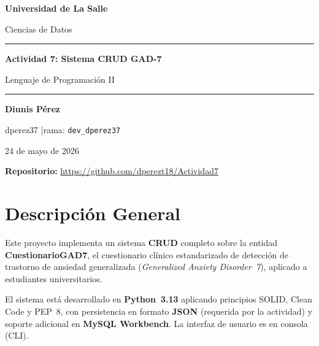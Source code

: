 \documentclass[12pt, a4paper]{article}
\begin{document}
\begin{titlepage}
  \centering
  \vspace*{3cm}
  {\Large\bfseries Universidad de La Salle\par}
  \vspace{0.3cm}
  {\normalsize Ciencias de Datos\par}
  \vspace{2.5cm}
  \rule{0.6\linewidth}{1pt}\par\vspace{1cm}
  {\LARGE\bfseries Actividad 7: Sistema CRUD GAD-7\par}
  \vspace{0.4cm}
  {\normalsize Lenguaje de Programación II\par}
  \vspace{1cm}
  \rule{0.6\linewidth}{1pt}\par\vspace{2.5cm}
  {\large\bfseries Diunis Pérez\par}
  \vspace{0.3cm}
  {\small dperez37 \quad|\quad rama: \texttt{dev\_dperez37}\par}
  \vspace{0.3cm}
  {\small 24 de mayo de 2026\par}
  \vspace{1cm}
  {\small\textbf{Repositorio:} \url{https://github.com/dperezt18/Actividad7}\par}
\end{titlepage}

\newpage\setcounter{page}{1}

\section{Descripción General}

Este proyecto implementa un sistema \textbf{CRUD} completo sobre la entidad
\textbf{CuestionarioGAD7}, el cuestionario clínico estandarizado de detección de
trastorno de ansiedad generalizada (\textit{Generalized Anxiety Disorder~7}),
aplicado a estudiantes universitarios.

El sistema está desarrollado en \textbf{Python~3.13} aplicando principios SOLID,
Clean Code y PEP~8, con persistencia en formato \textbf{JSON} (requerida por la
actividad) y soporte adicional en \textbf{MySQL Workbench}. La interfaz de
usuario es en consola (CLI).
\end{document}
